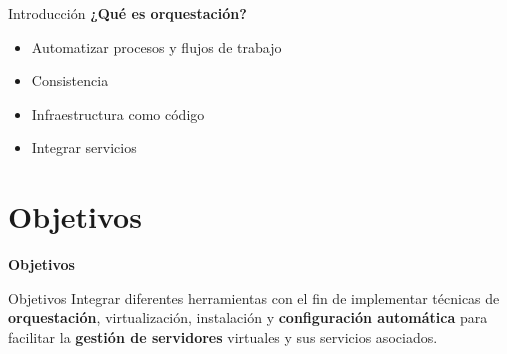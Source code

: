 \begin{frame}{Introducción}
    \vspace{0cm}
    \textbf{¿Qué es orquestación?}
    \begin{itemize}
        \item Automatizar procesos y flujos de trabajo
        \item Consistencia
        \item Infraestructura como código
        \item Integrar servicios
    \end{itemize}

\end{frame}
\section{Objetivos}

\begin{frame}
    \Huge
    \centering
    \textbf{Objetivos}

\end{frame}

\begin{frame}{Objetivos}
    \vspace{0cm}
    Integrar diferentes herramientas con el fin de implementar técnicas de \textbf{orquestación}, virtualización, instalación y \textbf{configuración automática} para facilitar la \textbf{gestión de servidores} virtuales y sus servicios asociados.

\end{frame}

%
%


